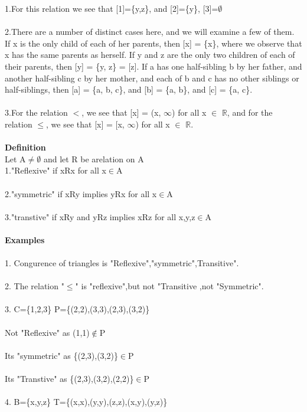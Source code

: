 \documentclass[a4paper,english,12pt]{article}
\begin{document}
1.For this relation we see that [1]=\{y,z\}, and [2]=\{y\}, [3]=$\emptyset$\\\\
2.There are a number of distinct cases here, and we will examine a few of them.
If x is the only child of each of her parents, then [x] = \{x\}, where we observe that
x has the same parents as herself. If y and z are the only two children of each of
their parents, then [y] = \{y, z\} = [z]. If a has one half-sibling b by her father, and
another half-sibling c by her mother, and each of b and c has no other siblings or
half-siblings, then [a] = \{a, b, c\}, and [b] = \{a, b\}, and [c] = \{a, c\}.\\\\
3.For the relation $<$, we see that [x] = (x, $\infty$) for all x $\in$ $\mathbb{R}$, and for the relation
$\leq$, we see that [x] = [x, $\infty$) for all x $\in$ $\mathbb{R}$.\\\\
\textbf{Definition}\\
Let A$\neq \emptyset$ and let R be arelation on A\\
1."Reflexive" if xRx for all x$\in$A\\\\
2."symmetric" if xRy implies yRx for all x$\in$A\\\\
3."transtive" if xRy and yRz implies xRz for all x,y,z$\in$A\\\\
\textbf{Examples}\\\\
1. Congurence of triangles is "Reflexive","symmetric",Transitive".\\\\
2. The relation "$\leq$" is "reflexive",but not "Transitive ,not "Symmetric".\\\\
3. C=\{1,2,3\} P=\{(2,2),(3,3),(2,3),(3,2)\}\\\\
  Not "Reflexive" as (1,1)$\notin$P\\\\
  Its "symmetric" as \{(2,3),(3,2)\}$\in$P\\\\
  Its "Transtive" as \{(2,3),(3,2),(2,2)\}$\in$P\\\\
4. B=\{x,y,z\}       T=\{(x,x),(y,y),(z,z),(x,y),(y,z)\}\\\\
\end{document}
